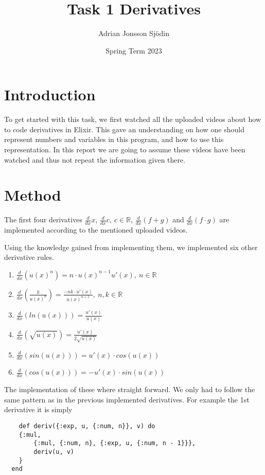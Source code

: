 \documentclass[a4paper,11pt]{article}
\begin{document}
\title{
    \textbf{Task 1 Derivatives}
}
\author{Adrian Jonsson Sjödin}
\date{Spring Term 2023}

\maketitle

\section*{Introduction}
To get started with this task, we first watched all the uploaded videos about how to code derivatives in Elixir.
This gave an understanding on how one should represent numbers and variables in this program, and how to use
this representation. In this report we are going to assume these videos have been watched and thus not repeat the
information given there.

\section*{Method}
The first four derivatives $\frac{d}{dx}x$, $\frac{d}{dx}c, \ c\in \mathbb{R}$, $\frac{d}{dx}(f+g)$ and 
$\frac{d}{dx}(f\cdot g)$ are implemented according to the mentioned uploaded videos.

Using the knowledge gained from implementing them, we implemented six other derivative rules.
\begin{enumerate}
    \item $\frac{d}{dx}(u(x)^n) = n\cdot u(x)^{n-1}u'(x), \ n\in \mathbb{R}$
    \item $\frac{d}{dx}(\frac{k}{u(x)^n}) = \frac{-nk\cdot u'(x)}{u(x)^{n+1}}, \ n,k\in \mathbb{R}$
    \item $\frac{d}{dx}(ln(u(x))) = \frac{u'(x)}{u(x)}$
    \item $\frac{d}{dx}(\sqrt{u(x)}) = \frac{u'(x)}{2 \sqrt{u(x)}}$
    \item $\frac{d}{dx}(sin(u(x))) = u'(x)\cdot cos(u(x))$
    \item $\frac{d}{dx}(cos(u(x))) = -u'(x)\cdot sin(u(x))$
\end{enumerate}

The implementation of these where straight forward. We only had to follow the same pattern as in the previous implemented
derivatives. For example the 1st derivative it is simply 
\begin{verbatim}
    def deriv({:exp, u, {:num, n}}, v) do
    {:mul, 
        {:mul, {:num, n}, {:exp, u, {:num, n - 1}}},
        deriv(u, v)
    }
  end
\end{verbatim}
\end{document}
